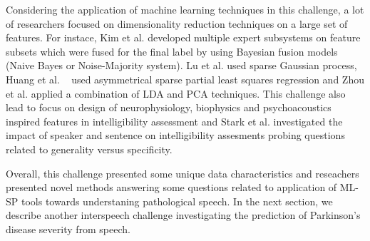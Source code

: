 \documentclass{article}
\begin{document}
Considering the application of machine learning techniques in this challenge, a lot of researchers focused on dimensionality reduction techniques on a large set of features. 
For instace, Kim et al. \cite{kim2012intelligibility} developed multiple expert subsystems on feature subsets which were fused for the final label by using Bayesian fusion models (Naive Bayes or Noise-Majority system).
Lu et al. \cite{lu2012predicting} used sparse Gaussian process, Huang et al. ~\cite{huang2012detecting} used asymmetrical sparse partial least squares regression and Zhou et al. \cite{zhou2012automatic} applied a combination of LDA and PCA techniques.
This challenge also lead to focus on design of neurophysiology, biophysics and psychoacoustics \cite{zhou2012automatic} inspired features in intelligibility assessment and Stark et al. \cite{stark2012interspeech} investigated the impact of speaker and sentence on intelligibility assesments probing questions related to generality versus specificity.

Overall, this challenge presented some unique data characteristics and reseachers presented novel methods answering some questions related to application of ML-SP tools towards understaning pathological speech.
In the next section, we describe another interspeech challenge investigating the prediction of Parkinson's disease severity from speech. 


\end{document}
